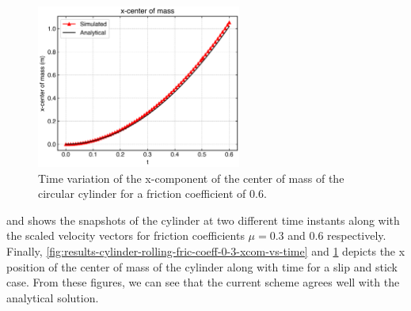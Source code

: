 %
\begin{figure}[!htpb]
  \centering
  \includegraphics[width=0.6\textwidth]{figures/csph/figures/de_2021_cylinder_rolling_on_an_inclined_plane/fric_coeff_0_6/xcom_vs_time}
  \caption{Time variation of the x-component of the center of mass of the
    circular cylinder for a friction coefficient of $0.6$.}
\label{fig:results-cylinder-rolling-fric-coeff-0-6-xcom-vs-time}
\end{figure}
 and  shows
the snapshots of the cylinder at two different time instants along with the
scaled velocity vectors for friction coefficients $\mu=0.3$ and $0.6$
respectively. Finally,
\cref{fig:results-cylinder-rolling-fric-coeff-0-3-xcom-vs-time} and
\cref{fig:results-cylinder-rolling-fric-coeff-0-6-xcom-vs-time} depicts the x
position of the center of mass of the cylinder along with time for a slip and
stick case. From these figures, we can see that the current scheme agrees well
with the analytical solution.

\FloatBarrier%

